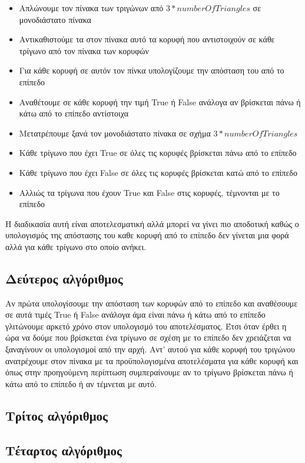 \documentclass{article}
\begin{document}
\begin{itemize}
	\item Απλώνουμε τον πίνακα των τριγώνων από $3*numberOfTriangles$ σε μονοδιάστατο πίνακα
	\item Αντικαθιστούμε τα στον πίνακα αυτό τα κορυφή που αντιστοιχούν σε κάθε τρίγωνο
		από τον πίνακα των κορυφών
	\item Για κάθε κορυφή σε αυτόν τον πίνκα υπολογίζουμε την απόσταση του από το επίπεδο
	\item Αναθέτουμε σε κάθε κορυφή την τιμή True ή False ανάλογα αν βρίσκεται πάνω ή κάτω από το επίπεδο αντίστοιχα
	\item Μετατρέπουμε ξανά τον μονοδιάστατο πίνακα σε σχήμα $3*numberOfTriangles$
	\item Κάθε τρίγωνο που έχει True σε όλες τις κορυφές βρίσκεται πάνω από το επίπεδο
	\item Κάθε τρίγωνο που έχει False σε όλες τις κορυφές βρίσκεται κατώ από το επίπεδο
	\item Αλλιώς τα τρίγωνα που έχουν True και False στις κορυφές, τέμνονται με το επίπεδο
\end{itemize}

Η διαδικασία αυτή είναι αποτελεσματική αλλά μπορεί να γίνει πιο αποδοτική καθώς ο
υπολογισμός της απόστασης του καθε κορυφή από το επίπεδο δεν γίνεται μια φορά αλλά για
κάθε τρίγωνο στο οποίο ανήκει.

\subsection{Δεύτερος αλγόριθμος}
Αν πρώτα υπολογίσουμε την απόσταση των κορυφών από το επίπεδο και αναθέσουμε σε αυτά
τιμές True ή False ανάλογα άμα είναι πάνω ή κάτω από το επίπεδο γλιτώνουμε αρκετό χρόνο
στον υπολογισμό του αποτελέσματος. Έτσι όταν έρθει η ώρα να δούμε που βρίσκεται ένα
τρίγωνο σε σχέση με το επίπεδο δεν χρειάζεται να ξαναγίνουν οι υπολογισμοί από την αρχή.
Αντ' αυτού για κάθε κορυφή του τριγώνου ανατρέχουμε στον πίνακα με τα προϋπολογισμένα
αποτελέσματα για κάθε κορυφή και όπως στην προηγούμενη περίπτωση συμπεραίνουμε αν το
τρίγωνο βρίσκεται πάνω ή κάτω από το επίπεδο ή αν τέμνεται με αυτό.

\subsection{Τρίτος αλγόριθμος}
\subsection{Τέταρτος αλγόριθμος}
\end{document}
